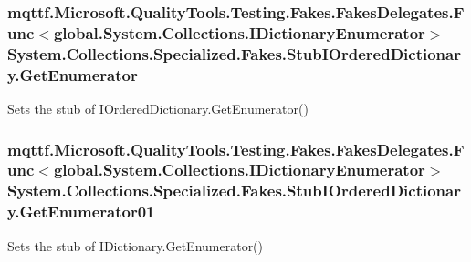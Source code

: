 \hypertarget{class_system_1_1_collections_1_1_specialized_1_1_fakes_1_1_stub_i_ordered_dictionary_a98f13b6a25737190e7f3b2a082ae2cc8}{
\subsubsection[{Get\-Enumerator}]{\setlength{\rightskip}{0pt plus 5cm}mqttf.\-Microsoft.\-Quality\-Tools.\-Testing.\-Fakes.\-Fakes\-Delegates.\-Func$<$global.\-System.\-Collections.\-I\-Dictionary\-Enumerator$>$ System.\-Collections.\-Specialized.\-Fakes.\-Stub\-I\-Ordered\-Dictionary.\-Get\-Enumerator}}\label{class_system_1_1_collections_1_1_specialized_1_1_fakes_1_1_stub_i_ordered_dictionary_a98f13b6a25737190e7f3b2a082ae2cc8}


Sets the stub of I\-Ordered\-Dictionary.\-Get\-Enumerator()

\hypertarget{class_system_1_1_collections_1_1_specialized_1_1_fakes_1_1_stub_i_ordered_dictionary_abbec93c75773cb77faf2ec9360e3df99}{
\subsubsection[{Get\-Enumerator01}]{\setlength{\rightskip}{0pt plus 5cm}mqttf.\-Microsoft.\-Quality\-Tools.\-Testing.\-Fakes.\-Fakes\-Delegates.\-Func$<$global.\-System.\-Collections.\-I\-Dictionary\-Enumerator$>$ System.\-Collections.\-Specialized.\-Fakes.\-Stub\-I\-Ordered\-Dictionary.\-Get\-Enumerator01}}\label{class_system_1_1_collections_1_1_specialized_1_1_fakes_1_1_stub_i_ordered_dictionary_abbec93c75773cb77faf2ec9360e3df99}


Sets the stub of I\-Dictionary.\-Get\-Enumerator()

